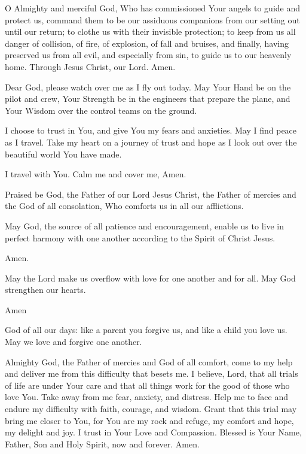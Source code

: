 \label{prayer:travelers}
O Almighty and merciful God, Who has commissioned Your angels to guide and protect us, command them to be our assiduous companions from our setting out until our return;
to clothe us with their invisible protection;
to keep from us all danger of collision, of fire, of explosion, of fall and bruises, and finally, having preserved us from all evil, and especially from sin, to guide us to our heavenly home.
Through Jesus Christ, our Lord. Amen.

Dear God, please watch over me as I fly out today.
May Your Hand be on the pilot and crew, Your Strength be in the engineers that prepare the plane, and Your Wisdom over the control teams on the ground.

I choose to trust in You, and give You my fears and anxieties.
May I find peace as I travel.
Take my heart on a journey of trust and hope as I look out over the beautiful world You have made.

I travel with You.
Calm me and cover me,
Amen.

\label{prayer:times_of_trouble}
Praised be God, the Father of our Lord Jesus Christ, the Father of mercies and the God of all consolation, Who comforts us in all our afflictions.

May God, the source of all patience and encouragement, enable us to live in perfect harmony with one another according to the Spirit of Christ Jesus.

\response Amen.

May the Lord make us overflow with love for one another and for all.
May God strengthen our hearts.

\response Amen

God of all our days: like a parent you forgive us, and like a child you love us.
May we love and forgive one another.

Almighty God, the Father of mercies and God of all comfort, come to my help and deliver me from this difficulty that besets me.
I believe, Lord, that all trials of life are under Your care and that all things work for the good of those who love You.
Take away from me fear, anxiety, and distress.
Help me to face and endure my difficulty with faith, courage, and wisdom.
Grant that this trial may bring me closer to You, for You are my rock and refuge, my comfort and hope, my delight and joy.
I trust in Your Love and Compassion.
Blessed is Your Name, Father, Son and Holy Spirit, now and forever. Amen.

